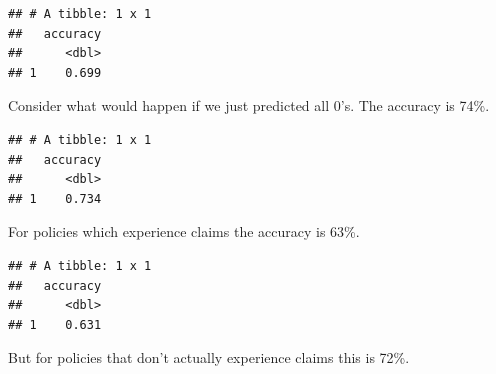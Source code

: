 \documentclass[openany]{book}
\newenvironment{Shaded}{\begin{snugshade}}{\end{snugshade}}
\newcommand{\DataTypeTok}[1]{\textcolor[rgb]{0.13,0.29,0.53}{#1}}
\newcommand{\DecValTok}[1]{\textcolor[rgb]{0.00,0.00,0.81}{#1}}
\newcommand{\KeywordTok}[1]{\textcolor[rgb]{0.13,0.29,0.53}{\textbf{#1}}}
\newcommand{\NormalTok}[1]{#1}
\newcommand{\OperatorTok}[1]{\textcolor[rgb]{0.81,0.36,0.00}{\textbf{#1}}}
\newcommand{\StringTok}[1]{\textcolor[rgb]{0.31,0.60,0.02}{#1}}
\begin{document}
\begin{verbatim}
## # A tibble: 1 x 1
##   accuracy
##      <dbl>
## 1    0.699
\end{verbatim}

Consider what would happen if we just predicted all 0's. The accuracy is 74\%.

\begin{Shaded}
\end{Shaded}

\begin{verbatim}
## # A tibble: 1 x 1
##   accuracy
##      <dbl>
## 1    0.734
\end{verbatim}

For policies which experience claims the accuracy is 63\%.

\begin{Shaded}
\end{Shaded}

\begin{verbatim}
## # A tibble: 1 x 1
##   accuracy
##      <dbl>
## 1    0.631
\end{verbatim}

But for policies that don't actually experience claims this is 72\%.

\begin{Shaded}
\end{Shaded}
\end{document}
